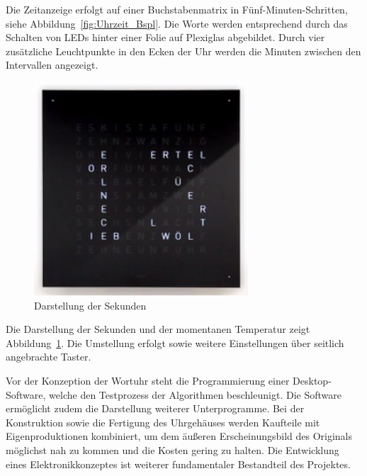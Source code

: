 %
Die Zeitanzeige erfolgt auf einer Buchstabenmatrix in Fünf-Minuten-Schritten, siehe Abbildung~\ref{fig:Uhrzeit_Bspl}. Die Worte werden entsprechend durch das Schalten von LEDs hinter einer Folie auf Plexiglas abgebildet. Durch vier zusätzliche Leuchtpunkte in den Ecken der Uhr werden die Minuten zwischen den Intervallen angezeigt.

\begin{figure}[h]
    \centering
    \includegraphics[width=8cm]{Abbildungen/Sekunden}
    \caption[Sekunden]{Darstellung der Sekunden}
    \label{fig:Sekunden}
\end{figure}

Die Darstellung der Sekunden und der momentanen Temperatur zeigt Abbildung~\ref{fig:Sekunden}. Die Umstellung erfolgt sowie weitere Einstellungen über seitlich angebrachte Taster. 

Vor der Konzeption der Wortuhr steht die Programmierung einer Desktop-Software, welche den Testprozess der Algorithmen beschleunigt. Die Software ermöglicht zudem die Darstellung weiterer Unterprogramme. 
Bei der Konstruktion sowie die Fertigung des Uhrgehäuses werden Kaufteile mit Eigenproduktionen kombiniert, um dem äußeren Erscheinungsbild des Originals möglichst nah zu kommen und die Kosten gering zu halten. Die Entwicklung eines Elektronikkonzeptes ist  weiterer fundamentaler Bestandteil des Projektes.



